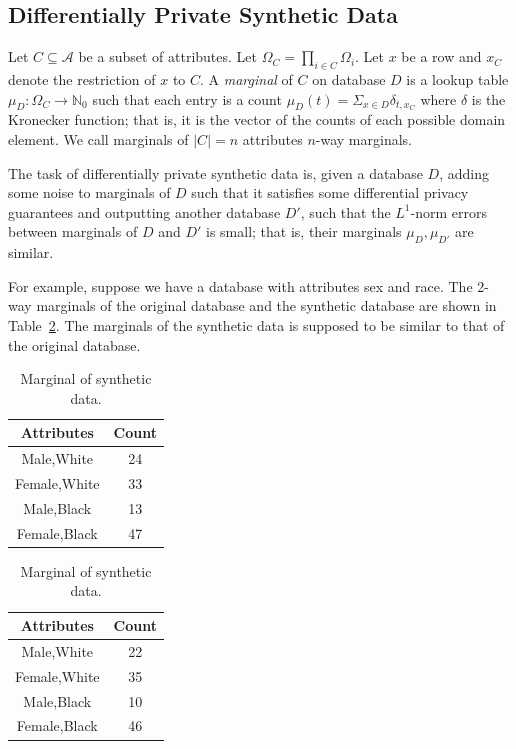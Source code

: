 \documentclass[manuscript,screen,review,anonymous]{acmart}
\renewcommand{\implies}{\rightarrow}
\newcommand{\db}{D}
\begin{document}
\subsection{Differentially Private Synthetic Data}

Let $C \subseteq \mathcal{A}$ be a subset of attributes. Let $\Omega_C = \prod_{i \in C} \Omega_i$. Let $x$ be a row and $x_C$ denote the restriction of $x$ to $C$. A \emph{marginal}\cite{barak2007privacy,mckenna2021winning} of $C$ on database $\db$ is a lookup table $\mu_{\db} : \Omega_C \implies \mathbb{N}_0$ such that each entry is a count $\mu_{\db}(t) = \Sigma_{x \in \db} \delta_{t,{x_C}}$ where $\delta$ is the Kronecker function; that is, it is the vector of the counts of each possible domain element. We call marginals of $|C| = n$ attributes $n$-way marginals.

The task of differentially private synthetic data\cite{Ullman2022,McKenna2022,NIST_Differentially_Private_Synthetic_Data,YouTube_Differentially_Private_Synthetic_Data} is, given a database $\db$, adding some noise to marginals of $\db$ such that it satisfies some differential privacy guarantees and outputting another database $\db'$, such that the $L^1$-norm errors between marginals of $\db$ and $\db'$ is small; that is, their marginals $\mu_{\db},\mu_{\db'}$ are similar.

For example, suppose we have a database with attributes sex and race. The 2-way marginals of the original database and the synthetic database are shown in Table~\ref{tab:marginal-example}. The marginals of the synthetic data is supposed to be similar to that of the original database.

\begin{table}[h]
\caption{Example marginals.}
\label{tab:marginal-example}
\centering
\begin{subtable}[t]{0.45\linewidth}
\centering
\caption{Marginal of original data.}
\begin{tabular}{cc}
\toprule
Attributes & Count \\
\midrule
Male,White & 24 \\
Female,White & 33 \\
Male,Black & 13 \\
Female,Black & 47 \\
\bottomrule
\end{tabular}
\end{subtable}
\hspace{0.05\linewidth}
\begin{subtable}[t]{0.45\linewidth}
\centering
\caption{Marginal of synthetic data.}
\begin{tabular}{cc}
\toprule
Attributes & Count \\
\midrule
Male,White & 22 \\
Female,White & 35 \\
Male,Black & 10 \\
Female,Black & 46 \\
\bottomrule
\end{tabular}
\end{subtable}
\end{table}
\end{document}

